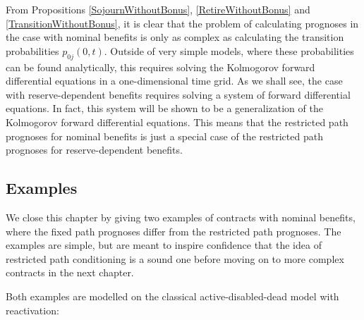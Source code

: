 \documentclass{article}
\newcommand{\1}[1]{\mathbbm{1}_{\left\lbrace #1 \right\rbrace}}
\theoremstyle{break}
\theoremstyle{remark}
\newenvironment{remark}
  {\pushQED{\qed}\renewcommand{\qedsymbol}{\scalebox{1.4}{$\circ$}}\remarkx}
  {\popQED\endremarkx}
\numberwithin{equation}{section}
\begin{document}
\begin{remark}
	From Propositions \ref{SojournWithoutBonus}, \ref{RetireWithoutBonus} and \ref{TransitionWithoutBonus}, it is clear that the problem of calculating prognoses in the case with nominal benefits is only as complex as calculating the transition probabilities $p_{0j}(0,t)$. Outside of very simple models, where these probabilities can be found analytically, this requires solving the Kolmogorov forward differential equations in a one-dimensional time grid. As we shall see, the case with reserve-dependent benefits requires solving a system of forward differential equations. In fact, this system will be shown to be a generalization of the Kolmogorov forward differential equations. This means that the restricted path prognoses for nominal benefits is just a special case of the restricted path prognoses for reserve-dependent benefits.
\end{remark}

\subsection{Examples}

We close this chapter by giving two examples of contracts with nominal benefits, where the fixed path prognoses differ from the restricted path prognoses. The examples are simple, but are meant to inspire confidence that the idea of restricted path conditioning is a sound one before moving on to more complex contracts in the next chapter.

Both examples are modelled on the classical active-disabled-dead model with reactivation:
\end{document}
